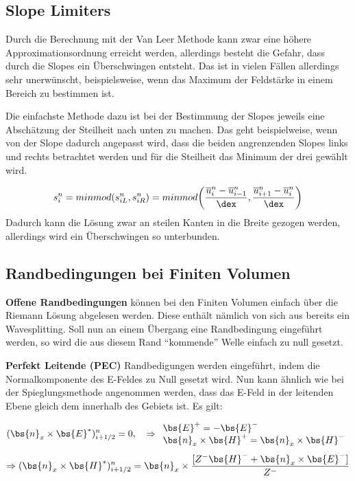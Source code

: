 \subsection{Slope Limiters}
Durch die Berechnung mit der Van Leer Methode kann zwar eine h\"ohere Approximationsordnung erreicht werden, allerdings besteht die Gefahr, dass durch die Slopes ein \"Uberschwingen entsteht. Das ist in vielen F\"allen allerdings sehr unerw\"unscht, beispielsweise, wenn das Maximum der Feldst\"arke in einem Bereich zu bestimmen ist.
\par
Die einfachste Methode dazu ist bei der Bestimmung der Slopes jeweils eine Absch\"atzung der Steilheit nach unten zu machen. Das geht beispielweise, wenn von der Slope dadurch angepasst wird, dass die beiden angrenzenden Slopes links und rechts betrachtet werden und f\"ur die Steilheit das Minimum der drei gew\"ahlt wird. 
\par
\begin{equation*}
	s_i^n = minmod(s^n_{iL},s^n_{iR}) = minmod \bigg(\frac{\overline{u}^n_i - \overline{u}^n_{i-1}}{\dex},\frac{\overline{u}^n_{i+1} - \overline{u}^n_{i}}{\dex}\bigg)
\end{equation*}
Dadurch kann die L\"osung zwar an steilen Kanten in die Breite gezogen werden, allerdings wird ein \"Uberschwingen so unterbunden.

\subsection{Randbedingungen bei Finiten Volumen}
\textbf{Offene Randbedingungen} k\"onnen bei den Finiten Volumen einfach \"uber die Riemann L\"osung abgelesen werden. Diese enth\"alt n\"amlich von sich aus bereits ein Wavesplitting. Soll nun an einem \"Ubergang eine Randbedingung eingef\"uhrt werden, so wird die aus diesem Rand ``kommende'' Welle einfach zu null gesetzt.
\par
\textbf{Perfekt Leitende (PEC)} Randbedigungen werden eingef\"uhrt, indem die Normalkomponente des E-Feldes zu Null gesetzt wird. Nun kann \"ahnlich wie bei der Spieglungsmethode angenommen werden, dass das E-Feld in der leitenden Ebene gleich dem innerhalb des Gebiets ist. Es gilt:
\par
\begin{equation*}
	(\bs{n}_x \times \bs{E}^*)^n_{i+1/2} = 0,~~~\Rightarrow \begin{array}{ll} \bs{E}^+ = -\bs{E}^- \\ \bs{n}_x \times \bs{H}^+ = \bs{n}_x \times \bs{H}^-  \end{array}
\end{equation*}
\begin{equation*}
	\Rightarrow (\bs{n}_x \times \bs{H}^*)^n_{i+1/2} = \bs{n}_x \times \frac{[Z^-\bs{H}^- + \bs{n}_x\times\bs{E}^-]}{Z^-}
\end{equation*}

